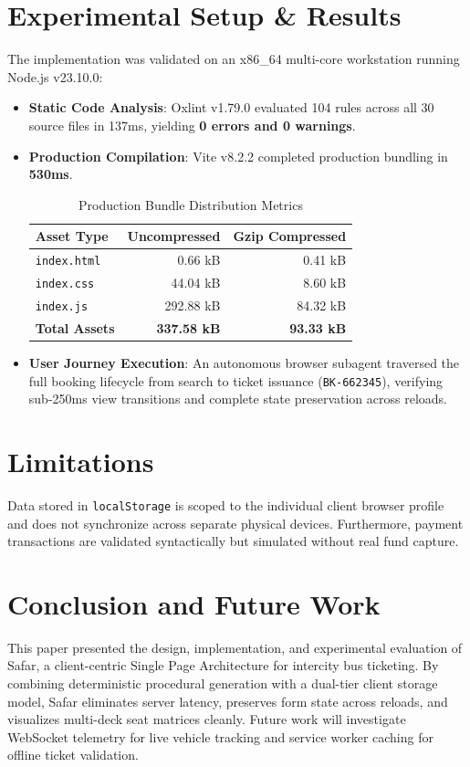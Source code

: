 \documentclass[conference]{IEEEtran}
\begin{document}
\section{Experimental Setup \& Results}
The implementation was validated on an x86\_64 multi-core workstation running Node.js v23.10.0:
\begin{itemize}
    \item \textbf{Static Code Analysis}: Oxlint v1.79.0 evaluated 104 rules across all 30 source files in 137ms, yielding \textbf{0 errors and 0 warnings}.
    \item \textbf{Production Compilation}: Vite v8.2.2 completed production bundling in \textbf{530ms}.
    \begin{table}[htbp]
    \caption{Production Bundle Distribution Metrics}
    \begin{center}
    \begin{tabular}{lrr}
    \toprule
    \textbf{Asset Type} & \textbf{Uncompressed} & \textbf{Gzip Compressed} \\
    \midrule
    \texttt{index.html} & 0.66 kB & 0.41 kB \\
    \texttt{index.css} & 44.04 kB & 8.60 kB \\
    \texttt{index.js} & 292.88 kB & 84.32 kB \\
    \textbf{Total Assets} & \textbf{337.58 kB} & \textbf{93.33 kB} \\
    \bottomrule
    \end{tabular}
    \end{center}
    \end{table}
    \item \textbf{User Journey Execution}: An autonomous browser subagent traversed the full booking lifecycle from search to ticket issuance (\texttt{BK-662345}), verifying sub-250ms view transitions and complete state preservation across reloads.
\end{itemize}

\section{Limitations}
Data stored in \texttt{localStorage} is scoped to the individual client browser profile and does not synchronize across separate physical devices. Furthermore, payment transactions are validated syntactically but simulated without real fund capture.

\section{Conclusion and Future Work}
This paper presented the design, implementation, and experimental evaluation of Safar, a client-centric Single Page Architecture for intercity bus ticketing. By combining deterministic procedural generation with a dual-tier client storage model, Safar eliminates server latency, preserves form state across reloads, and visualizes multi-deck seat matrices cleanly. Future work will investigate WebSocket telemetry for live vehicle tracking and service worker caching for offline ticket validation.



\end{document}
